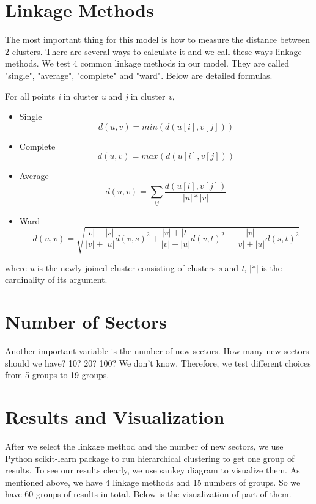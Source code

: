\documentclass[../main.tex]{subfiles}
\begin{document}
\section{Linkage Methods}

The most important thing for this model is how to measure the distance between 2 clusters. There are several ways to calculate it and we call these ways linkage methods. We test 4 common linkage methods in our model. They are called "single", "average", "complete" and "ward". Below are detailed formulas.

For all points \textit{i} in cluster \textit{u} and \textit{j} in cluster \textit{v},
\begin{itemize}
\item Single
$$ d(u,v) = min(d(u[i],v[j])) $$
\item Complete
$$ d(u,v) = max(d(u[i],v[j])) $$
\item Average
$$ d(u,v) = \sum_{ij}{\frac{d(u[i],v[j])}{|u|*|v|}} $$
\item Ward
$$ d(u,v) = \sqrt{\frac{|v|+|s|}{|v|+|u|}d(v,s)^2 + \frac{|v|+|t|}{|v|+|u|}d(v,t)^2 - \frac{|v|}{|v|+|u|}d(s,t)^2} $$
\end{itemize}
where \textit{u} is the newly joined cluster consisting of clusters \textit{s} and \textit{t}, $|*|$ is the cardinality of its argument.

\section{Number of Sectors}

Another important variable is the number of new sectors. How many new sectors should we have? 10? 20? 100? We don't know. Therefore, we test different choices from 5 groups to 19 groups.

\section{Results and Visualization}

After we select the linkage method and the number of new sectors, we use Python scikit-learn package to run hierarchical clustering to get one group of results. To see our results clearly, we use sankey diagram to visualize them. As mentioned above, we have 4 linkage methods and 15 numbers of groups. So we have 60 groups of results in total. Below is the visualization of part of them.
\end{document}
